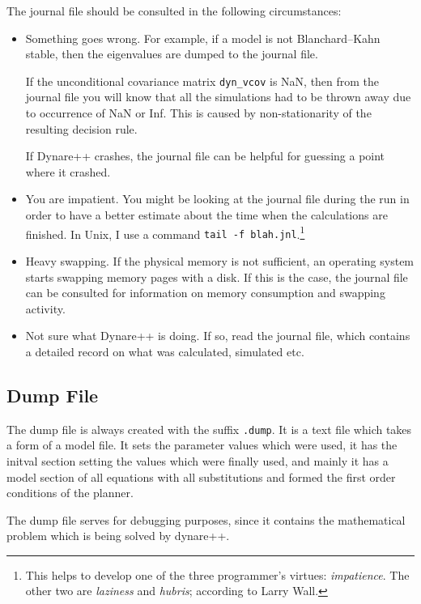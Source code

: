 \documentclass[10pt]{article}
\begin{document}
The journal file should be consulted in the following circumstances:
\begin{itemize}
\item Something goes wrong. For example, if a model is not
Blanchard--Kahn stable, then the eigenvalues are dumped to the journal
file.

If the unconditional covariance matrix {\tt dyn\_vcov} is NaN, then
from the journal file you will know that all the simulations had to be
thrown away due to occurrence of NaN or Inf. This is caused by
non-stationarity of the resulting decision rule.

If Dynare++ crashes, the journal file can be helpful for guessing a
point where it crashed.

\item You are impatient. You might be looking at the journal file
during the run in order to have a better estimate about the time when
the calculations are finished. In Unix, I use a command {\tt tail -f
blah.jnl}.\footnote{This helps to develop one of the three
programmer's virtues: {\it impatience}. The other two are {\it
laziness} and {\it hubris}; according to Larry Wall.}

\item Heavy swapping. If the physical memory is not
sufficient, an operating system starts swapping memory pages with a
disk. If this is the case, the journal file can be consulted for
information on memory consumption and swapping activity.

\item Not sure what Dynare++ is doing. If so, read the journal file,
which contains a detailed record on what was calculated, simulated
etc.
\end{itemize}

\subsection{Dump File}
\label{dumpfile}

The dump file is always created with the suffix {\tt .dump}. It is a
text file which takes a form of a model file. It sets the parameter
values which were used, it has the initval section setting the values
which were finally used, and mainly it has a model section of all
equations with all substitutions and formed the first order conditions
of the planner.

The dump file serves for debugging purposes, since it contains the
mathematical problem which is being solved by dynare++.
\end{document}
